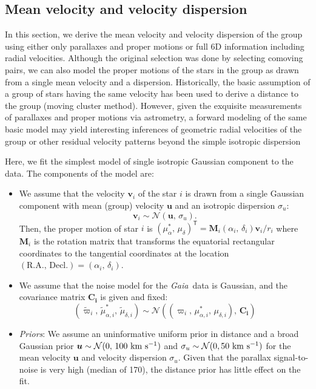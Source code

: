 \documentclass[modern,letterpaper]{aastex61}
\newcommand{\project}[1]{\textsl{#1}}
\newcommand{\gaia}{\project{Gaia}}
\newcommand{\normal}{{\mathcal{N}}}
\newcommand{\transp}[1]{{#1}^{\!\mathsf{T}}}
\newcommand{\bs}[1]{\boldsymbol{#1}}
\newcommand{\mat}[1]{\mathbf{#1}}
\renewcommand{\vec}[1]{\bs{#1}}
\newcommand{\kms}{\ensuremath{\rm km~s^{-1}}}
\newcommand{\pmra}{\ensuremath{\mu_\alpha^*}}
\newcommand{\pmdec}{\ensuremath{\mu_\delta}}
\begin{document}
\subsection{Mean velocity and velocity dispersion}
\label{sec:fitting}

In this section, we derive the mean velocity and velocity dispersion of the
group using either only parallaxes and proper motions or full 6D information
including radial velocities.
Although the original selection was done by selecting comoving pairs, we can
also model the proper motions of the stars in the group as drawn from a single
mean velocity and a dispersion.
Historically, the basic assumption of a group of stars having the same velocity
has been used to derive a distance to the group (moving cluster method).
However, given the exquisite measurements of parallaxes and proper motions via
astrometry, a forward modeling of the same basic model may yield interesting
inferences of geometric radial velocities of the group or other residual
velocity patterns beyond the simple isotropic dispersion
\citep{1999A&A...348.1040D,2002A&A...381..446M}

Here, we fit the simplest model of single isotropic Gaussian component to the data.
The components of the model are:
\begin{itemize}
  \item We assume that the velocity $\vec{v}_i$ of the star $i$ is drawn from
    a single Gaussian component with mean (group) velocity $\vec{u}$ and
    an isotropic dispersion $\sigma_{u}$:
    $$\vec{v}_i \sim \normal(\vec{u},\,\sigma_{u}).$$
    Then, the proper motion of star $i$ is
    $\transp{(\pmra,\,\pmdec)} = \mat{M}_i(\alpha_i,\,\delta_i) \vec{v}_i / r_i$ where
    $\mat{M}_i$ is the rotation matrix that transforms the equatorial
    rectangular coordinates to the tangential coordinates at the location
    $(\mathrm{R.A.},\,\mathrm{Decl.}) = (\alpha_i,\,\delta_i)$.

  \item We assume that the noise model for the \gaia\ data is Gaussian, and
    the covariance matrix $\mat{C_i}$ is given and fixed:
    $$(\tilde\varpi_i,\,\tilde\mu_{\alpha,i}^*,\,\tilde\mu_{\delta,i}) \sim
      \normal((\varpi_i,\,\mu_{\alpha,i}^*,\,\mu_{\delta,i}),\,\mat{C_i})$$

  \item \emph{Priors}:
    We assume an uninformative uniform prior in distance and a broad Gaussian
    prior $\vec{u} \sim \normal(0,\,100~\kms)$ and $\sigma_u \sim \normal(0, 50~\kms)$
    for the mean velocity $\vec{u}$ and velocity dispersion $\sigma_u$.
    Given that the parallax signal-to-noise is very high (median of 170),
    the distance prior has little effect on the fit.
\end{itemize}
\end{document}
